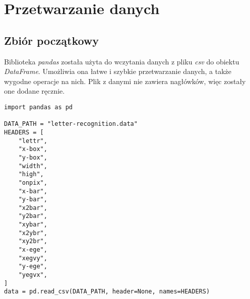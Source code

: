 \section{Przetwarzanie danych}\label{sec:przetwarzanie_danych}
\subsection{Zbiór początkowy}\label{subsec:filtrowanie_danych}
Biblioteka \textit{pandas}\cite{mckinney-proc-scipy-2010} została użyta do wczytania danych z pliku \textit{csv} do obiektu \textit{DataFrame}.
Umożliwia ona łatwe i szybkie przetwarzanie danych, a także wygodne operacje na nich. Plik z danymi nie zawiera nagłówków, więc zostały one dodane ręcznie.
\begin{verbatim}
import pandas as pd

DATA_PATH = "letter-recognition.data"
HEADERS = [
    "lettr",
    "x-box",
    "y-box",
    "width",
    "high",
    "onpix",
    "x-bar",
    "y-bar",
    "x2bar",
    "y2bar",
    "xybar",
    "x2ybr",
    "xy2br",
    "x-ege",
    "xegvy",
    "y-ege",
    "yegvx",
]
data = pd.read_csv(DATA_PATH, header=None, names=HEADERS)
\end{verbatim}